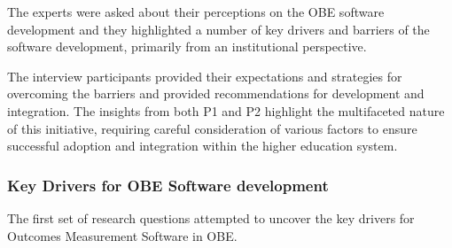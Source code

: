 \documentclass[journal,onecolumn]{IEEEtran}
\begin{document}
The experts were asked about their perceptions on the OBE software development and they highlighted a number of key drivers and barriers of the software development, primarily from an institutional perspective.

The interview participants provided their expectations and strategies for overcoming the barriers and provided recommendations for development and integration. The insights from both P1 and P2 highlight the multifaceted nature of this initiative, requiring careful consideration of various factors to ensure successful adoption and integration within the higher education system.

\subsubsection{\textbf{Key Drivers for OBE Software development}}

The first set of research questions attempted to uncover the key drivers for Outcomes Measurement Software in OBE.
\end{document}
